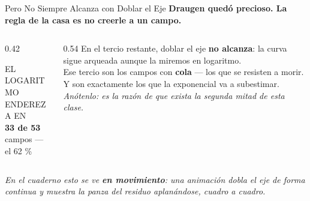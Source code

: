 \documentclass[aspectratio=169, 11pt]{beamer}
\begin{document}
\begin{frame}[shrink=8]{Pero No Siempre Alcanza con Doblar el Eje}
  \vspace{-4pt}
  {\small\color{arcaDark}\bfseries
   Draugen quedó precioso. La regla de la casa es no creerle a un campo.}
  \vspace{10pt}
  \begin{columns}[T]
    \begin{column}{0.42\textwidth}
      \begin{tcolorbox}[colback=arcaGray, colframe=arcaRed, boxrule=0pt, leftrule=3pt,
        arc=3pt, left=6pt, right=6pt, top=7pt, bottom=7pt]
        \centering
        {\scriptsize\color{textMuted}EL LOGARITMO ENDEREZA EN}\\[5pt]
        {\LARGE\color{arcaRed}\bfseries 33 de 53}\\[5pt]
        {\scriptsize\color{textMuted}campos --- el 62 \%}
      \end{tcolorbox}
    \end{column}
    \begin{column}{0.54\textwidth}
      {\footnotesize\color{textMuted}
      En el tercio restante, doblar el eje \textbf{no alcanza}: la curva sigue
      arqueada aunque la miremos en logaritmo.\\[7pt]
      Ese tercio son los campos con \textbf{cola} --- los que se resisten a
      morir. Y son exactamente los que la exponencial va a subestimar.}
      \vspace{7pt}
      {\footnotesize\color{arcaDark}\itshape
       Anótenlo: es la razón de que exista la segunda mitad de esta clase.}
    \end{column}
  \end{columns}
  \vspace{9pt}
  {\scriptsize\color{textMuted}\itshape
   En el cuaderno esto se ve \textbf{en movimiento}: una animación dobla el eje
   de forma continua y muestra la panza del residuo aplanándose, cuadro a cuadro.}
\end{frame}
\end{document}
